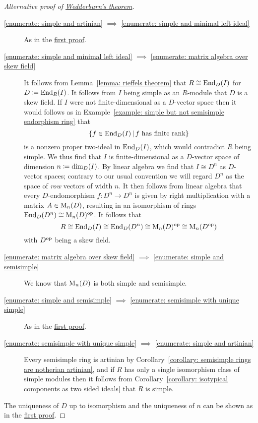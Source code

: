\begin{proof}[Alternative proof of {\hyperref[theorem: wedderburns theorem]{Wedderburn’s theorem}}]
  \leavevmode
  \begin{description}
    \item[\ref*{enumerate: simple and artinian} $\implies$ \ref*{enumerate: simple and minimal left ideal}]
      As in the \hyperref[proof: wedderburns theorem first proof]{first proof}.
    \item[\ref*{enumerate: simple and minimal left ideal} $\implies$ \ref*{enumerate: matrix algebra over skew field}]
      It follows from Lemma~\ref{lemma: rieffels theorem} that $R \cong \operatorname{End}_D(I)$ for $D \coloneqq \operatorname{End}_R(I)$.
      It follows from $I$ being simple as an $R$-module that $D$ is a skew field.
      If $I$ were not finite-dimensional as a $D$-vector space then it would follows as in Example~\ref{example: simple but not semisimple endorphism ring} that
      \[
        \{
          f \in \End_D(I)
        \suchthat
          \text{$f$ has finite rank}
        \}
      \]
      is a nonzero proper two-ideal in $\operatorname{End}_D(I)$, which would contradict $R$ being simple.
      We thus find that $I$ is finite-dimensional as a $D$-vector space of dimension $n \coloneqq \dim_D(I)$.
      By linear algebra we find that $I \cong D^n$ as $D$-vector spaces;
      contrary to our usual convention we will regard $D^n$ as the space of \emph{row} vectors of width $n$.
      It then follows from linear algebra that every $D$-endomorphism $f \colon D^n \to D^n$ is given by right multiplication with a matrix $A \in \operatorname{M}_n(D)$, resulting in an isomorphism of rings $\operatorname{End}_D(D^n) \cong \operatorname{M}_n(D)^{\operatorname{op}}$.
      It follows that
      \[
              R
        \cong \operatorname{End}_D(I)
        \cong \operatorname{End}_D(D^n)
        \cong \operatorname{M}_n(D)^{\operatorname{op}}
        \cong \operatorname{M}_n(D^{\operatorname{op}})
      \]
      with $D^{\operatorname{op}}$ being a skew field.
    \item[\ref*{enumerate: matrix algebra over skew field} $\implies$ \ref*{enumerate: simple and semisimple}]
      We know that $\operatorname{M}_n(D)$ is both simple and semisimple.
    \item[\ref*{enumerate: simple and semisimple} $\implies$ \ref*{enumerate: semisimple with unique simple}]
      As in the \hyperref[proof: wedderburns theorem first proof]{first proof}.
    \item[\ref*{enumerate: semisimple with unique simple} $\implies$ \ref*{enumerate: simple and artinian}]
      Every semisimple ring is artinian by Corollary~\ref{corollary: semisimple rings are notherian artinian}, and if $R$ has only a single isomorphism class of simple modules then it follows from Corollary~\ref{corollary: isotypical components as two sided ideals} that $R$ is simple.
  \end{description}
  The uniqueness of $D$ up to isomorphism and the uniqueness of $n$ can be shown as in the \hyperref[proof: wedderburns theorem first proof]{first proof}.
\end{proof}



